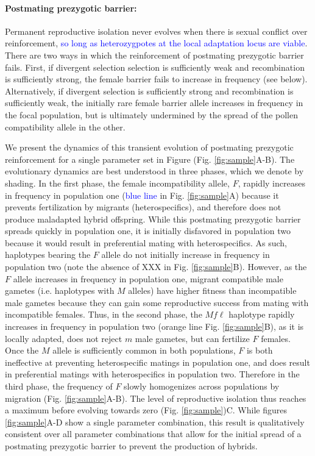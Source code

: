 \documentclass[11pt]{article}
\begin{document}
\paragraph{Postmating prezygotic barrier:} Permanent reproductive isolation never evolves when there is sexual conflict over reinforcement, \textcolor{blue}{so long as heterozygpotes at the local adaptation locus are viable}.  
There are two ways in which the reinforcement of postmating prezygotic barrier fails. 
First, if divergent selection selection is sufficiently weak and recombination is sufficiently strong, the female barrier fails to increase in frequency (see below).
Alternatively, if divergent selection is sufficiently strong and recombination is sufficiently weak, the initially rare female barrier allele increases in frequency in the focal population, but is ultimately undermined by the spread of the pollen compatibility allele in the other. 

We present the dynamics of this transient evolution of postmating prezygotic reinforcement for a single parameter set in Figure (Fig. \ref{fig:sample}A-B). 
The evolutionary dynamics are best understood in three phases, which we denote by shading. 
In the first phase,  the female incompatibility allele, $F$, rapidly increases in frequency in population one (\textcolor{blue}{blue line} in Fig. \ref{fig:sample}A) because it prevents fertilization by migrants (heterospecifics), and therefore does not produce maladapted hybrid offspring.   
While this postmating prezygotic barrier spreads quickly in population one, it is initially disfavored in population two because it would result in preferential mating with heterospecifics.  
As such, haplotypes bearing the $F$ allele do not initially increase in frequency in population two (note the absence of XXX in Fig. \ref{fig:sample}B). 
However, as the $F$ allele increases in frequency in population one, migrant compatible male gametes  (i.e. haplotypes with $M$ alleles) have higher fitness than incompatible male gametes because they can gain some reproductive success from mating with incompatible females.  
Thus, in the second phase, the  $Mf\ell$ haplotype rapidly increases in frequency in population two (orange line Fig. \ref{fig:sample}B), as it is locally adapted, does not reject $m$ male gametes, but can fertilize $F$ females. 
Once the $M$ allele is sufficiently common in both populations, $F$ is both ineffective at preventing heterospecific matings in population one, and does result in preferential matings with heterospecifics in population two. 
Therefore in the third phase, the frequency of $F$ slowly homogenizes across populations by migration (Fig. \ref{fig:sample}A-B).
The level of reproductive isolation thus reaches a maximum before evolving towards zero (Fig. \ref{fig:sample})C.  
While figures \ref{fig:sample}A-D show a single parameter combination, this result is qualitatively consistent over all parameter combinations that allow for the initial spread of a postmating prezygotic barrier to prevent the production of hybrids. 
\end{document}
